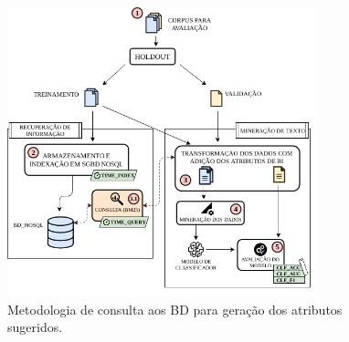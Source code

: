 \begin{figure}[H]
    \centering
    \caption{Metodologia de consulta aos BD para geração dos atributos sugeridos.}
    \begin{center}
        \includegraphics[width=0.8\textwidth]{img/diagrama-metodologia-v2-1.png}
    \end{center}
    \vspace{-0.5cm}
    \label{fig:diagrama-cosulta-geração-atributos}
\end{figure}